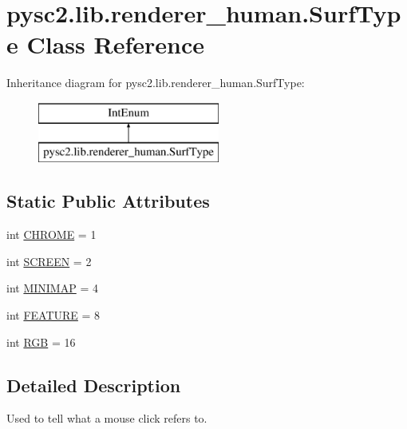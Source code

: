 \hypertarget{classpysc2_1_1lib_1_1renderer__human_1_1_surf_type}{}\section{pysc2.\+lib.\+renderer\+\_\+human.\+Surf\+Type Class Reference}
\label{classpysc2_1_1lib_1_1renderer__human_1_1_surf_type}
Inheritance diagram for pysc2.\+lib.\+renderer\+\_\+human.\+Surf\+Type\+:\begin{figure}[H]
\begin{center}
\leavevmode
\includegraphics[height=2.000000cm]{classpysc2_1_1lib_1_1renderer__human_1_1_surf_type}
\end{center}
\end{figure}
\subsection*{Static Public Attributes}
\begin{DoxyCompactItemize}
\item 
int \mbox{\hyperlink{classpysc2_1_1lib_1_1renderer__human_1_1_surf_type_a7854f73f0eb878d17d146e5f603bd024}{C\+H\+R\+O\+ME}} = 1
\item 
int \mbox{\hyperlink{classpysc2_1_1lib_1_1renderer__human_1_1_surf_type_aaf7635c1cbc6f99928ab8d29561e92ae}{S\+C\+R\+E\+EN}} = 2
\item 
int \mbox{\hyperlink{classpysc2_1_1lib_1_1renderer__human_1_1_surf_type_aa77b3a54e99ed18cd1e3ec089cd56d46}{M\+I\+N\+I\+M\+AP}} = 4
\item 
int \mbox{\hyperlink{classpysc2_1_1lib_1_1renderer__human_1_1_surf_type_acc1556c3552924c44fb21a5cee484bcb}{F\+E\+A\+T\+U\+RE}} = 8
\item 
int \mbox{\hyperlink{classpysc2_1_1lib_1_1renderer__human_1_1_surf_type_ab8ecc884170fdef25831364e0e122da7}{R\+GB}} = 16
\end{DoxyCompactItemize}


\subsection{Detailed Description}
\begin{DoxyVerb}Used to tell what a mouse click refers to.\end{DoxyVerb}
 

